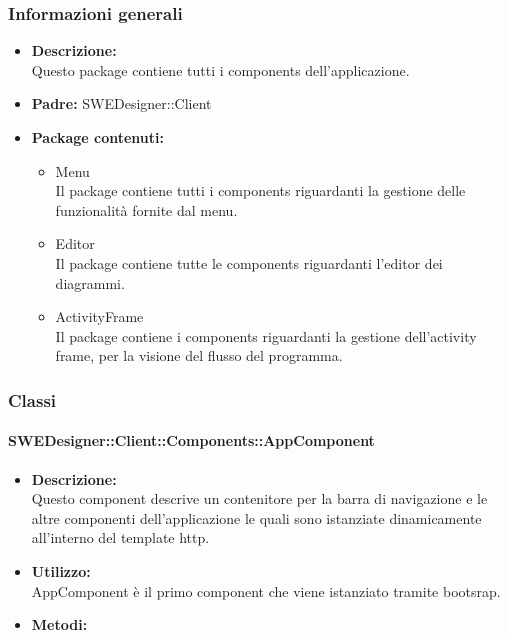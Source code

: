 		\subsubsection{Informazioni generali}
			\begin{itemize}
          		\item \textbf{Descrizione:}\\
          		Questo package contiene tutti i components dell’applicazione.
          		\item \textbf{Padre:} SWEDesigner::Client
          		\item \textbf{Package contenuti:}\\
          		\begin{itemize}
          			\item Menu\\
          			Il package contiene tutti i components riguardanti la gestione delle funzionalità fornite dal menu.
          			\item Editor\\
          			Il package contiene tutte le components riguardanti l’editor dei diagrammi.
          			\item ActivityFrame\\
          			Il package contiene i components riguardanti la gestione dell’activity frame, per la visione del flusso del programma.
          		\end{itemize}
          	\end{itemize}
		\subsubsection{Classi}
			\paragraph{SWEDesigner::Client::Components::AppComponent}
				\begin{itemize}
          			\item \textbf{Descrizione:}\\
          			Questo component descrive un contenitore per la barra di navigazione e le altre componenti dell’applicazione le quali sono istanziate dinamicamente all’interno del template http.
          			\item \textbf{Utilizzo:}\\
          			AppComponent è il primo component che viene istanziato tramite bootsrap.
          			\item \textbf{Metodi:}\\
          		\end{itemize}
